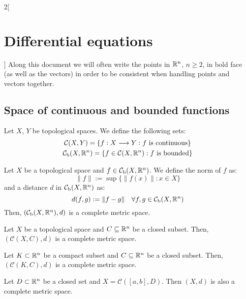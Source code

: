 \documentclass[../../../main.tex]{subfiles}
\begin{document}
\renewcommand{\col}{\apl}
\begin{multicols}{2}[\section{Differential equations}]
  Along this document we will often write the points in $\mathbb{R}^n$, $n\geq 2$, in bold face (as well as the vectors) in order to be consistent when handling points and vectors together.
  \subsection{Space of continuous and bounded functions}
  \begin{definition}
    Let $X$, $Y$ be topological spaces. We define the following sets:
    \begin{gather*}
      \mathcal{C}(X,Y)=\{f:X\longrightarrow Y:f\text{ is continuous}\}\\
      \mathcal{C}_\text{b}(X,\mathbb{R}^n)=\{f\in\mathcal{C}(X,\mathbb{R}^n):f\text{ is bounded}\}
    \end{gather*}
  \end{definition}
  \begin{theorem}
    Let $X$ be a topological space and $f\in\mathcal{C}_\text{b}(X,\mathbb{R}^n)$. We define the norm of $f$ as: $$\|f\|:=\sup\{\|f(x)\|:x\in X\}$$ and a distance $d$ in $\mathcal{C}_\text{b}(X,\mathbb{R}^n)$ as: $$d(f,g):=\|f-g\|\quad\forall f,g\in\mathcal{C}_\text{b}(X,\mathbb{R}^n)$$
    Then, $(\mathcal{C}_\text{b}(X,\mathbb{R}^n),d)$ is a complete metric space.
  \end{theorem}
  \begin{theorem}
    Let $X$ be a topological space and $C\subseteq\mathbb{R}^n$ be a closed subset. Then, $(\mathcal{C}(X,C),d)$ is a complete metric space.
  \end{theorem}
  \begin{corollary}
    Let $K\subset \mathbb{R}^n$ be a compact subset and $C\subseteq\mathbb{R}^n$ be a closed subset. Then, $(\mathcal{C}(K,C),d)$ is a complete metric space.
  \end{corollary}
  \begin{corollary}
    Let $D\subset\mathbb{R}^n$ be a closed set and $X=\mathcal{C}([a,b],D)$. Then $(X,d)$ is also a complete metric space.
  \end{corollary}

\end{multicols}
\end{document}
